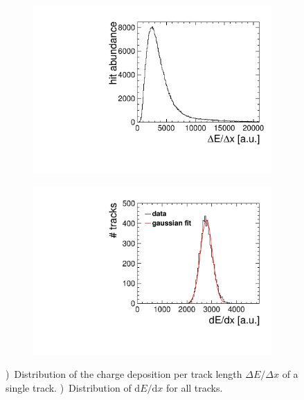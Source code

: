 \begin{figure}
\begin{subfigure}[b]{0.48\textwidth}
\includegraphics[width=\textwidth]{Tracker/TPC_Bonn/plots/TPC-DG_dEdxHitDist_v2.pdf}
\caption{}
\label{sfig:dedx_distr}
\end{subfigure}
\begin{subfigure}[b]{0.48\textwidth}
\includegraphics[width=\textwidth]{Tracker/TPC_Bonn/plots/TPC-DG_dEdxMeanDist_v2.pdf}
\caption{}
\label{sfig:dedx_mean}
\end{subfigure}
\caption{\small
  \protect{})~Distribution of the charge deposition per track length $\Delta E / \Delta x$ of a single track.
  \protect{})~Distribution of \ensuremath{\mathrm{d}E/\mathrm{d}x} for all tracks.
}
\label{fig:dedx_distributions}
\end{figure}

